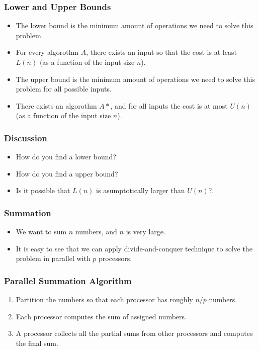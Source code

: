 \documentclass{beamer}
\begin{document}
\begin{CJK}{UTF8}{bsmi}
\begin{frame}
\frametitle{Lower and Upper Bounds}
\begin{itemize}
\item The lower bound is the minimum amount of operations we need to solve this problem.
\item For every algorothm $A$, there exists an input so that the cost is at least $L(n)$ (as a function of the input size $n$).
\item The upper bound is the minimum amount of operations we need to solve this problem for all possible inputs.
\item There exists an algorothm $A*$, and for all inputs the cost is at most $U(n)$ (as a function of the input size $n$).
\end{itemize}
\end{frame}

\begin{frame}
\frametitle{Discussion}
\begin{itemize}
\item How do you find a lower bound?
\item How do you find a upper bound?
\item Is it possible that $L(n)$ is asumptotically larger than $U(n)$?. 
\end{itemize}
\end{frame}



\begin{frame}
\frametitle{Summation}
\begin{itemize}
\item We want to sum $n$ numbers, and $n$ is very large.
\item It is easy to see that we can apply divide-and-conquer technique  to solve the problem in parallel with $p$ processors.
\end{itemize}
\end{frame}

\begin{frame}
\frametitle{Parallel Summation Algorithm}
\begin{enumerate}
\item Partition the numbers so that each processor has roughly $n/p$ numbers.
\item Each processor computes the sum of assigned numbers.
\item A processor collects all the partial sums from other processors and computes the final sum.
\end{enumerate}
\end{frame}


\end{CJK}
\end{document}
